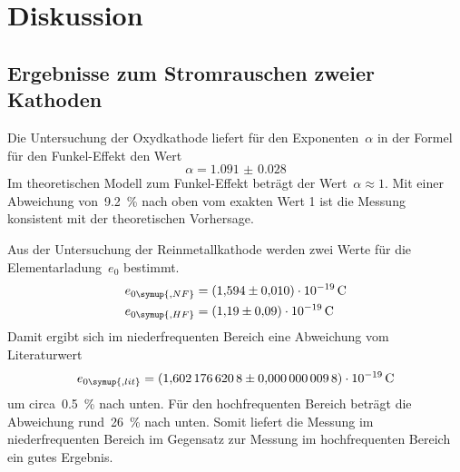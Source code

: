 \section{Diskussion}
\label{sec:diskussion}

\subsection{Ergebnisse zum Stromrauschen zweier Kathoden}

Die Untersuchung der Oxydkathode liefert für den Exponenten~$\alpha$ in der
Formel für den Funkel-Effekt den Wert
%
\begin{equation}
  \alpha=\num{1.091(28)}
\end{equation}
%
Im theoretischen Modell zum Funkel-Effekt beträgt der Wert~$\alpha\approx 1$.
Mit einer Abweichung von~\SI{9.2}{\percent} nach oben vom exakten Wert 1 ist die
Messung konsistent mit der theoretischen Vorhersage.

Aus der Untersuchung der Reinmetallkathode werden zwei Werte für die
Elementarladung~$e_0$ bestimmt.
%
\begin{align}
  e_{0\symup{, NF}}&=\SI{1.594(10)e-19}{\coulomb} \\
  e_{0\symup{, HF}}&=\SI{1.19(9)e-19}{\coulomb}
\end{align}
%
Damit ergibt sich im niederfrequenten Bereich eine Abweichung vom
Literaturwert~\cite{CODATA}
%
\begin{equation}
  e_{0\symup{, lit}}=\SI{1.6021766208(98)e-19}{\coulomb}
\end{equation}
%
um circa~\SI{0.5}{\percent} nach unten. Für den hochfrequenten Bereich beträgt
die Abweichung rund~\SI{26}{\percent} nach unten. Somit liefert die Messung im
niederfrequenten Bereich im Gegensatz zur Messung im hochfrequenten Bereich ein
gutes Ergebnis.
%
\nocite{V57}
